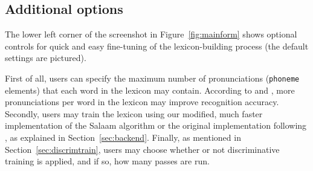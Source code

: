 \documentclass[11pt]{article}
\begin{document}



\subsection{Additional options}
\label{sec:options}

The lower left corner of the screenshot in Figure~\ref{fig:mainform} shows 
optional controls for quick and easy fine-tuning of the lexicon-building process (the default settings are pictured).

First of all, users
can specify the maximum number of pronunciations (\texttt{phoneme} elements) that each word in the lexicon may contain. According to  and , more pronunciations per word in the lexicon may 
improve recognition accuracy.
Secondly, users may train the lexicon using our modified, much faster implementation of the Salaam algorithm or the original implementation 
following , as explained in Section~\ref{sec:backend}.
Finally, as mentioned in Section~\ref{sec:discrimtrain}, users may choose whether or not discriminative training 
is applied, and if so, how many passes are run.

\end{document}
